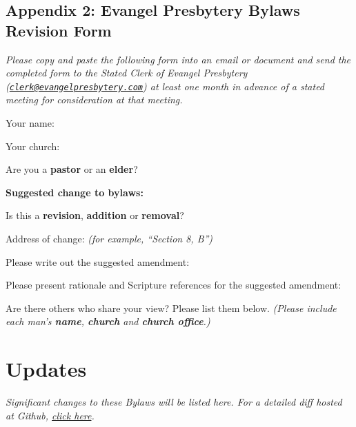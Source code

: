 \documentclass[
]{book}
\begin{document}
\hypertarget{appendix-2-evangel-presbytery-bylaws-revision-form}{%
\section*{Appendix 2: Evangel Presbytery Bylaws Revision Form}\label{appendix-2-evangel-presbytery-bylaws-revision-form}}

\emph{Please copy and paste the following form into an email or document and send the completed form to the Stated Clerk of Evangel Presbytery (\href{mailto:clerk@evangelpresbytery.com}{\nolinkurl{clerk@evangelpresbytery.com}}) at least one month in advance of a stated meeting for consideration at that meeting.}

Your name:

Your church:

Are you a \textbf{pastor} or an \textbf{elder}?

\textbf{Suggested change to bylaws:}

Is this a \textbf{revision}, \textbf{addition} or \textbf{removal}?

Address of change: \emph{(for example, ``Section 8, B'')}

Please write out the suggested amendment:

Please present rationale and Scripture references for the suggested amendment:

Are there others who share your view? Please list them below. \emph{(Please include each man's \textbf{name}, \textbf{church} and \textbf{church office}.)}

\hypertarget{updates}{%
\chapter*{Updates}\label{updates}}

\emph{Significant changes to these Bylaws will be listed here. For a detailed diff hosted at Github, \href{https://github.com/Evangel-Presbytery/evangel-bylaws}{click here}.}
\end{document}
